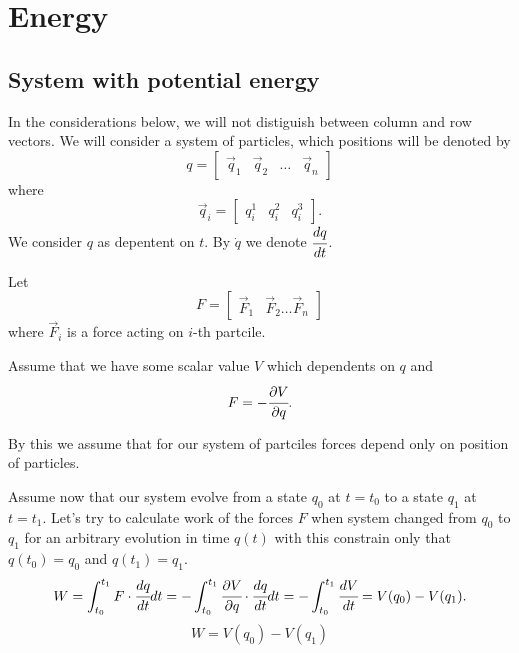 \documentclass[main.tex]{subfiles}
\begin{document}
\section{Energy}
\subsection{System with potential energy}
\label{potential_energy}
In the considerations below, we will not distiguish between column and row vectors.
We will consider a system of particles, which positions will be denoted by
\begin{equation}
\label{generalised-trajectory}
q = 
\begin{bmatrix}
\vec{q}_1 &
\vec{q}_2 &
\dots &
\vec{q}_n 
\end{bmatrix}
\end{equation}
where
\begin{equation}
\vec{q}_i = 
\begin{bmatrix}
q^1_i & 
q^2_i & 
q^3_i
\end{bmatrix}.
\end{equation}
We consider $q$ as depentent on $t$. By $\dot{q}$ we denote $\cfrac{dq}{dt}$.


Let
\begin{equation}
F = 
\begin{bmatrix}
\vec{F}_1 & \vec{F}_2 \dots \vec{F}_n
\end{bmatrix}
\end{equation} 
where $\vec{F}_i$ is a force acting on $i$-th partcile.

Assume that we have some scalar value $V$ which dependents on $q$ and
\begin{equation}
\label{force_in_potential}
F = -\cfrac{\partial V}{\partial q}.
\end{equation}

By this we assume that for our system of partciles forces depend only on position of particles.

Assume now that our system evolve from a state $q_0$ at $t=t_0$ to a state $q_1$ at $t=t_1$. Let's try to calculate work of the forces $F$ when system changed from $q_0$ to $q_1$ for an arbitrary evolution in time $q(t)$ with this constrain only that $q(t_0) = q_0$ and $q(t_1) = q_1$.
\begin{equation}
W = \int_{t_0}^{t_1} F\cdot \cfrac{dq}{dt} dt=-\int_{t_0}^{t_1} \cfrac{\partial V}{\partial q}\cdot \cfrac{dq}{dt} dt = - \int_{t_0}^{t_1} \cfrac{dV}{dt} = V(q_0) - V(q_1).
\end{equation}
\begin{equation}
\boxed{
W = V(q_0) - V(q_1)
}
\end{equation}
\end{document}

